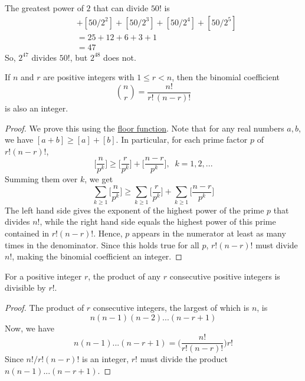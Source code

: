 \documentclass{article}
\newcounter{example}[section]
\begin{document}
\begin{example}
  \label{ex:greatest-power-of-2-dividing-50}
The greatest power of $2$ that can divide $50!$ is 
\begin{align*}
    [50/2] & + [50/2^2] + [50/ 2^3] + [50/2^4] + [50/2^5] \\
    & = 25+12+6+3+1 \\
    & = 47
\end{align*}
So, $2^{47}$ divides $50!$, but $2^{48}$ does not. 
\end{example}

\begin{lemma}
  \label{thm:integrality-of-the-binomial-coefficient}
If $n$ and $r$ are positive integers with $1 \leq r < n$, then the binomial coefficient 
\begin{equation}
  \binom{n}{r} = \frac{n!}{r!\, (n-r)!}
\end{equation}
is also an integer. 
\end{lemma}
\begin{proof}
We prove this using the \hyperref[def:floor-function]{floor function}. Note that for any real numbers $a, b$, we have $[a+b] \geq [a] + [b]$. In particular, for each prime factor $p$ of $r! (n-r)!$, 
\begin{equation}
  \bigg[\frac{n}{p^k}\bigg] \geq \bigg[\frac{r}{p^k}\bigg] + \bigg[\frac{n-r}{p^k}\bigg], \;\; k = 1, 2, ...
\end{equation}
Summing them over $k$, we get
\begin{equation}
  \sum_{k\geq 1} \bigg[\frac{n}{p^k}\bigg] \geq \sum_{k \geq 1} \bigg[\frac{r}{p^k}\bigg] + \sum_{k \geq 1} \bigg[\frac{n-r}{p^k}\bigg]
\end{equation}
The left hand side gives the exponent of the highest power of the prime $p$ that divides $n!$, while the right hand side equals the highest power of this prime contained in $r! (n-r)!$. Hence, $p$ appears in the numerator at least as many times in the denominator. Since this holds true for all $p$, $r!(n-r)!$ must divide $n!$, making the binomial coefficient an integer. 
\end{proof}

\begin{corollary}
  \label{thm:product-of-consecutive-integers-is-divisible-by}
For a positive integer $r$, the product of any $r$ consecutive positive integers is divisible by $r!$. 
\end{corollary}
\begin{proof}
The product of $r$ consecutive integers, the largest of which is $n$, is 
\begin{equation}
  n (n-1) (n-2) ... (n-r+1)
\end{equation}
Now, we have 
\begin{equation}
  n(n-1)... (n-r+1) = \bigg( \frac{n!}{r! (n-r)!} \bigg) r!
\end{equation}
Since $n!/r! (n-r)!$ is an integer, $r!$ must divide the product $n(n-1)...(n-r+1)$. 
\end{proof}
\end{document}
